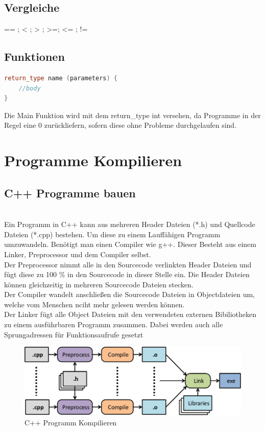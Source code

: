 \subsection{Vergleiche}
== ; < ; > ; >=; <= ; !=
		
\subsection{Funktionen}
\begin{lstlisting}[language=C++]
return_type name (parameters) {
	//body
}
\end{lstlisting}
Die Main Funktion wird mit dem return\_type int versehen, da Programme in der Regel eine 0 zurückliefern, sofern diese ohne Probleme durchgelaufen sind. 
\section{Programme Kompilieren}
\subsection{C++ Programme bauen}\qquad\\
Ein Programm in C++ kann aus mehreren Header Dateien (*.h) und Quellcode Dateien (*.cpp) bestehen. Um diese zu einem Lauffähigen Programm umzuwandeln. Benötigt man einen Compiler wie g++. Dieser Besteht aus einem Linker, Preprocessor und dem Compiler selbst. \\
Der Preprocessor nimmt alle in den Sourcecode verlinkten Header Dateien und fügt diese zu 100 \% in den Sourcecode in dieser Stelle ein. Die Header Dateien können gleichzeitig in mehreren Sourcecode Dateien stecken. \\
Der Compiler wandelt anschließen die Sourcecode Dateien in Objectdateien um, welche vom Menschen nciht mehr gelesen werden können.\\
Der Linker fügt alle Object Dateien mit den verwendeten externen Bibiliotheken zu einem ausführbaren Programm zusammen. Dabei werden auch alle Sprungadressen für Funktionsaufrufe gesetzt\\
\begin{figure}[h]
\centering
\includegraphics[width=0.75\linewidth]{mainmatter/pics/comp}
\caption[compiling]{C++ Programm Kompilieren}
\label{fig:comp}
\end{figure}
